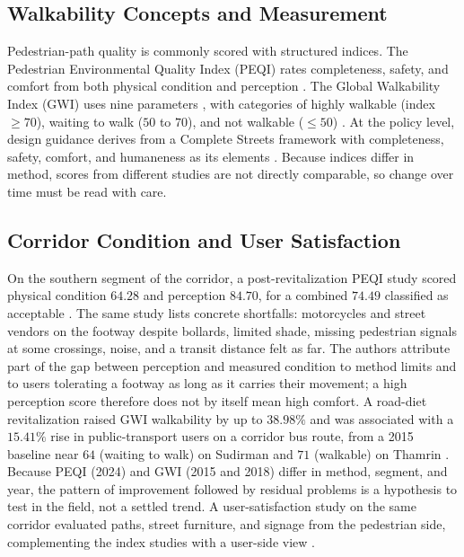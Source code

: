 \documentclass[conference]{IEEEtran}
\begin{document}
\subsection{Walkability Concepts and Measurement}
Pedestrian-path quality is commonly scored with structured indices. The Pedestrian Environmental
Quality Index (PEQI) rates completeness, safety, and comfort from both physical condition and
perception \autocite{dwisadana2024}. The Global Walkability Index (GWI) uses nine parameters
\autocite{ridhani2015,mulyadi2022}, with categories of highly walkable (index $\geq 70$), waiting
to walk ($50$ to $70$), and not walkable ($\leq 50$) \autocite{mulyadi2022}. At the policy level,
design guidance derives from a Complete Streets framework with completeness, safety, comfort, and
humaneness as its elements \autocite{itdp2019}. Because indices differ in method, scores from
different studies are not directly comparable, so change over time must be read with care.

\subsection{Corridor Condition and User Satisfaction}
On the southern segment of the corridor, a post-revitalization PEQI study scored physical
condition $64.28$ and perception $84.70$, for a combined $74.49$ classified as acceptable
\autocite{dwisadana2024}. The same study lists concrete shortfalls: motorcycles and street
vendors on the footway despite bollards, limited shade, missing pedestrian signals at some
crossings, noise, and a transit distance felt as far. The authors attribute part of the gap
between perception and measured condition to method limits and to users tolerating a footway as
long as it carries their movement; a high perception score therefore does not by itself mean high
comfort. A road-diet revitalization raised GWI walkability by up to $38.98\%$ and was associated
with a $15.41\%$ rise in public-transport users on a corridor bus route, from a 2015 baseline near
$64$ (waiting to walk) on Sudirman and $71$ (walkable) on Thamrin
\autocite{mulyadi2022,ridhani2015}. Because PEQI (2024) and GWI (2015 and 2018) differ in method,
segment, and year, the pattern of improvement followed by residual problems is a hypothesis to
test in the field, not a settled trend. A user-satisfaction study on the same corridor evaluated
paths, street furniture, and signage from the pedestrian side, complementing the index studies
with a user-side view \autocite{apritasari2020satisfaction}.
\end{document}
